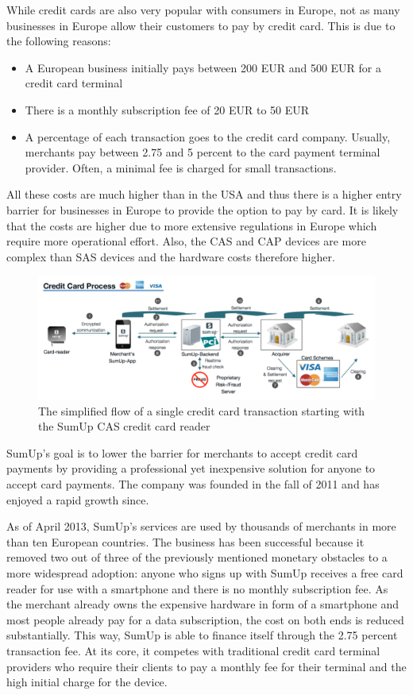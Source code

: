 \documentclass[a4paper, oneside]{csthesis}
\begin{document}
While credit cards are also very popular with consumers in Europe, not as many businesses in Europe allow their customers to pay by credit card. This is due to the following reasons:
\begin{itemize}
\item A European business initially pays between 200 EUR and 500 EUR for a credit card terminal
\item There is a monthly subscription fee of 20 EUR to 50 EUR
\item A percentage of each transaction goes to the credit card company. Usually, merchants pay between 2.75 and 5 percent to the card payment terminal provider. Often, a minimal fee is charged for small transactions.
\end{itemize}

All these costs are much higher than in the USA and thus there is a higher entry barrier for businesses in Europe to provide the option to pay by card. It is likely that the costs are higher due to more extensive regulations in Europe which require more operational effort. Also, the CAS and CAP devices are more complex than SAS devices and the hardware costs therefore higher.

\begin{figure}[tb]
    \begin{center}
        \includegraphics[width=\textwidth]{figures/credit-card-flow.png}
    \end{center}
    \caption{The simplified flow of a single credit card transaction starting with the SumUp CAS credit card reader}
    \label{fig:credit-card-flow}
\end{figure}

SumUp's goal is to lower the barrier for merchants to accept credit card payments by providing a professional yet inexpensive solution for anyone to accept card payments. The company was founded in the fall of 2011 and has enjoyed a rapid growth since.

As of April 2013, SumUp's services are used by thousands of merchants in more than ten European countries.
The business has been successful because it removed two out of three of the previously mentioned monetary obstacles to a more widespread adoption: anyone who signs up with SumUp receives a free card reader for use with a smartphone and there is no monthly subscription fee. As the merchant already owns the expensive hardware in form of a smartphone and most people already pay for a data subscription, the cost on both ends is reduced substantially. This way, SumUp is able to finance itself through the 2.75 percent transaction fee. At its core, it competes with traditional credit card terminal providers who require their clients to pay a monthly fee for their terminal and the high initial charge for the device.
\end{document}
